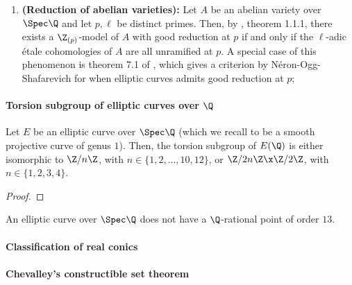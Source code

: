 \begin{example}
\begin{enumerate}
                \item \textbf{(Reduction of abelian varieties):} Let $A$ be an abelian variety over $\Spec \Q$ and let $p, \ell$ be distinct primes. Then, by \cite{conradbrinon}, theorem 1.1.1, there exists a $\Z_{(p)}$-model of $A$ with good reduction at $p$ if and only if the $\ell$-adic \'etale cohomologies of $A$ are all unramified at $p$. A special case of this phenomenon is theorem 7.1 of \cite{silverman_elliptic_curves}, which gives a criterion by N\'eron-Ogg-Shafarevich for when elliptic curves admits good reduction at $p$;  
            \end{enumerate}
        \end{example}
    
    \paragraph{Torsion subgroup of elliptic curves over \texorpdfstring{$\Q$}{}}
        \begin{remark}
            
        \end{remark}
        
        \begin{theorem}[Mazur]
            Let $E$ be an elliptic curve over $\Spec \Q$ (which we recall to be a smooth projective curve of genus $1$). Then, the torsion subgroup of $E(\Q)$ is either isomorphic to $\Z/n\Z$, with $n \in \{1, 2, ..., 10, 12\}$, or $\Z/2n\Z \x \Z/2\Z$, with $n \in \{1, 2, 3, 4\}$. 
        \end{theorem}
            \begin{proof}
                
            \end{proof}
        \begin{corollary}
            An elliptic curve over $\Spec \Q$ does not have a $\Q$-rational point of order $13$.
        \end{corollary}
    
    \paragraph{Classification of real conics}
    
    \paragraph{Chevalley's constructible set theorem}
        \begin{theorem}
            
        \end{theorem}
        
